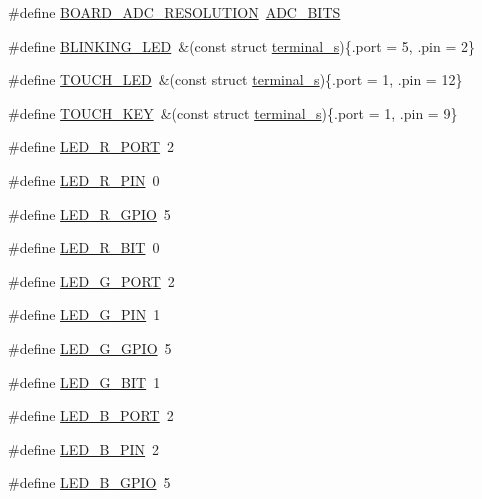 \begin{DoxyCompactItemize}
\item 
\#define \hyperlink{group__hal_ga5b673df98c7ace8c0428c12e0de5ec64}{B\+O\+A\+R\+D\+\_\+\+A\+D\+C\+\_\+\+R\+E\+S\+O\+L\+U\+T\+I\+ON}~\hyperlink{group___a_d_c__18_x_x__43_x_x_gga6da04ef4d158a6d61909481ed94df1a3a8cb6bb0d2b9d30206b3892df2e1776c2}{A\+D\+C\+\_\+B\+I\+TS}
\item 
\#define \hyperlink{group__hal_ga7df8b8faeffb332d3a85829727f6e3f3}{B\+L\+I\+N\+K\+I\+N\+G\+\_\+\+L\+ED}~\&(const struct \hyperlink{structterminal__s}{terminal\+\_\+s})\{.port = 5, .pin = 2\}
\item 
\#define \hyperlink{group__hal_ga11baf524276151957e8037eaed95b162}{T\+O\+U\+C\+H\+\_\+\+L\+ED}~\&(const struct \hyperlink{structterminal__s}{terminal\+\_\+s})\{.port = 1, .pin = 12\}
\item 
\#define \hyperlink{group__hal_ga622f361da595a38bbb742894f48f7339}{T\+O\+U\+C\+H\+\_\+\+K\+EY}~\&(const struct \hyperlink{structterminal__s}{terminal\+\_\+s})\{.port = 1, .pin = 9\}
\item 
\#define \hyperlink{group__hal_ga5a11a7cbc215e25401541277460113a4}{L\+E\+D\+\_\+\+R\+\_\+\+P\+O\+RT}~2
\item 
\#define \hyperlink{group__hal_ga22f3cf4ef9dadad8d78d5c59999100b6}{L\+E\+D\+\_\+\+R\+\_\+\+P\+IN}~0
\item 
\#define \hyperlink{group__hal_ga938c5edc31fe4ba21d42ac85c739bc9b}{L\+E\+D\+\_\+\+R\+\_\+\+G\+P\+IO}~5
\item 
\#define \hyperlink{group__hal_ga770cf8cc93e5ceb6b347f655d5425f03}{L\+E\+D\+\_\+\+R\+\_\+\+B\+IT}~0
\item 
\#define \hyperlink{group__hal_ga1ef377b425c83109ec7998dc6fa71345}{L\+E\+D\+\_\+\+G\+\_\+\+P\+O\+RT}~2
\item 
\#define \hyperlink{group__hal_ga3d793023ce3cf36a952b0b68ab1a389a}{L\+E\+D\+\_\+\+G\+\_\+\+P\+IN}~1
\item 
\#define \hyperlink{group__hal_gab4f388402d4d678445fee6617f96128d}{L\+E\+D\+\_\+\+G\+\_\+\+G\+P\+IO}~5
\item 
\#define \hyperlink{group__hal_gae425f2df67fc802fcf8a442a57a92c81}{L\+E\+D\+\_\+\+G\+\_\+\+B\+IT}~1
\item 
\#define \hyperlink{group__hal_ga24baefd05a8dea1a7241e288a735c17c}{L\+E\+D\+\_\+\+B\+\_\+\+P\+O\+RT}~2
\item 
\#define \hyperlink{group__hal_gac210a43d7fede956117cfb90baff9511}{L\+E\+D\+\_\+\+B\+\_\+\+P\+IN}~2
\item 
\#define \hyperlink{group__hal_ga91901ef42fb89387a433e685cb3f8745}{L\+E\+D\+\_\+\+B\+\_\+\+G\+P\+IO}~5

\end{DoxyCompactItemize}
